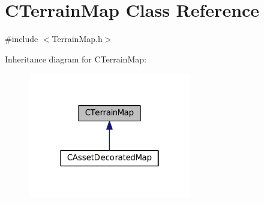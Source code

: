 \hypertarget{classCTerrainMap}{}\section{C\+Terrain\+Map Class Reference}
\label{classCTerrainMap}


{\ttfamily \#include $<$Terrain\+Map.\+h$>$}



Inheritance diagram for C\+Terrain\+Map\+:
\nopagebreak
\begin{figure}[H]
\begin{center}
\leavevmode
\includegraphics[width=202pt]{classCTerrainMap__inherit__graph}
\end{center}
\end{figure}
